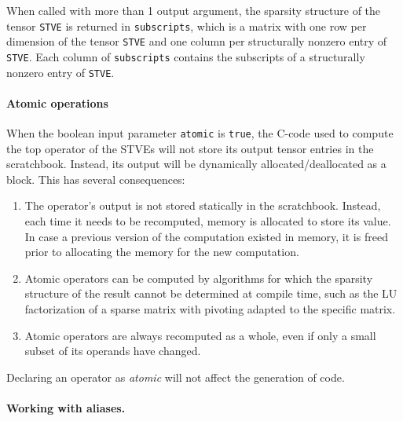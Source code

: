 \documentclass[11pt]{article}
\begin{document}
\medskip

When called with more than 1 output argument, the sparsity structure
of the tensor \lstinline{STVE} is returned in \lstinline{subscripts},
which is a matrix with one row per dimension of the tensor
\lstinline{STVE} and one column per structurally nonzero entry of
\lstinline{STVE}. Each column of \lstinline{subscripts} contains the
subscripts of a structurally nonzero entry of \lstinline{STVE}.

\paragraph*{Atomic operations}

When the boolean input parameter \lstinline{atomic} is
\lstinline{true}, the C-code used to compute the top operator of the
STVEs will not store its output tensor entries in the
scratchbook. Instead, its output will be dynamically
allocated/deallocated as a block. This has several consequences:
\begin{enumerate}
\item The operator's output is not stored statically in the
  scratchbook. Instead, each time it needs to be recomputed, memory is
  allocated to store its value. In case a previous version of the
  computation existed in memory, it is freed prior to allocating the
  memory for the new computation.

\item Atomic operators can be computed by algorithms for which the
  sparsity structure of the result cannot be determined at compile
  time, such as the LU factorization of a sparse matrix with pivoting
  adapted to the specific matrix.

\item Atomic operators are always recomputed as a whole, even if only
  a small subset of its operands have changed.
\end{enumerate}
Declaring an operator as \emph{atomic} will not affect the generation
of \matlab{} code.

\paragraph*{Working with aliases.}
\end{document}
